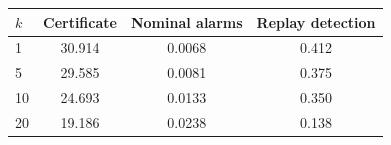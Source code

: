 \begin{tabular}{lccc}
\toprule
$k$ & Certificate & Nominal alarms & Replay detection \\
\midrule
1 & 30.914 & 0.0068 & 0.412 \\
5 & 29.585 & 0.0081 & 0.375 \\
10 & 24.693 & 0.0133 & 0.350 \\
20 & 19.186 & 0.0238 & 0.138 \\
\bottomrule
\end{tabular}
